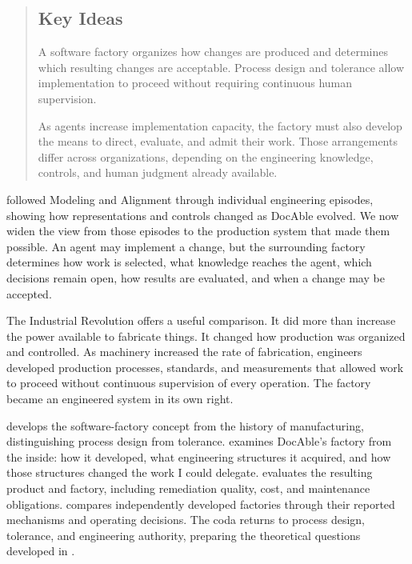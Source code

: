 



\begin{quote}
\mbox{}%
\subsection{Key Ideas}\label{heading:depth-and-breadth}

A software factory organizes how changes are produced and determines which resulting changes are acceptable. Process design and tolerance allow implementation to proceed without requiring continuous human supervision.

As agents increase implementation capacity, the factory must also develop the means to direct, evaluate, and admit their work. Those arrangements differ across organizations, depending on the engineering knowledge, controls, and human judgment already available.
\end{quote}

 followed Modeling and Alignment through individual engineering episodes, showing how representations and controls changed as DocAble evolved. We now widen the view from those episodes to the production system that made them possible. An agent may implement a change, but the surrounding factory determines how work is selected, what knowledge reaches the agent, which decisions remain open, how results are evaluated, and when a change may be accepted.

The Industrial Revolution offers a useful comparison. It did more than increase the power available to fabricate things. It changed how production was organized and controlled. As machinery increased the rate of fabrication, engineers developed production processes, standards, and measurements that allowed work to proceed without continuous supervision of every operation. The factory became an engineered system in its own right.

 develops the software-factory concept from the history of manufacturing, distinguishing process design from tolerance.  examines DocAble's factory from the inside: how it developed, what engineering structures it acquired, and how those structures changed the work I could delegate.  evaluates the resulting product and factory, including remediation quality, cost, and maintenance obligations.  compares independently developed factories through their reported mechanisms and operating decisions. The coda returns to process design, tolerance, and engineering authority, preparing the theoretical questions developed in .
